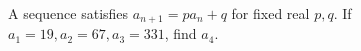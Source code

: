 A sequence satisfies $a_{n+1}=pa_n+q$ for fixed real $p,q$. If $a_1=19,a_2=67,a_3=331$, find $a_4$.
